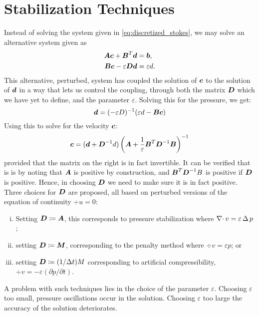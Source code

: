 \section{Stabilization Techniques}

Instead of solving the system given in \cref{eq:discretized_stokes}, we may
solve an alternative system given as
\begin{align}
    \boldsymbol{A}\boldsymbol{c} + \boldsymbol{B}^T \boldsymbol{d} &= \boldsymbol{b}, \\
    \boldsymbol{B}\boldsymbol{c} - \varepsilon \boldsymbol{D} \boldsymbol{d} &= \varepsilon d.
\end{align}
This alternative, perturbed,  system has coupled the solution of \( \boldsymbol{c} \) to
the solution of \( \boldsymbol{d} \) in a way that lets us control the coupling, through
both the matrix \( \boldsymbol{D} \) which we have yet to define, and the parameter \(
\varepsilon \).  Solving this for the pressure, we get:
\begin{equation}
    \boldsymbol{d} = (-\varepsilon D)^{-1}(\varepsilon d- \boldsymbol{B} \boldsymbol{c})
\end{equation}
Using this to solve for the velocity \( \boldsymbol{c} \):
\begin{equation}
    \boldsymbol{c} = (\boldsymbol{d} + \boldsymbol{D}^{-1}d) \left(\boldsymbol{A} + \frac{1}{\varepsilon}\boldsymbol{B}^T\boldsymbol{D}^{-1}\boldsymbol{B}\right)^{-1}
\end{equation}
provided that the matrix on the right is in fact invertible. It can be verified
that is is by noting that \(\boldsymbol{A}\) is positive by construction, and \( \boldsymbol{B}^T
\boldsymbol{D}^{-1} B \) is positive if \( \boldsymbol{D} \) is positive. Hence, in choosing \( \boldsymbol{D} \) we
need to make sure it is in fact positive. Three choices for \( \boldsymbol{D} \) are
proposed, all based on perturbed versions of the equation of continuity \( \div
u = 0 \):
\begin{enumerate}[(i)]
    \item Setting \( \boldsymbol{D} \coloneqq \boldsymbol{A} \), this corresponds to pressure
        stabilization where \(\operatorname{\mathop{}\!\nabla \cdot} v = \varepsilon \operatorname{\mathop{}\!\Delta} p \); 
    \item setting \( \boldsymbol{D} \coloneqq \boldsymbol{M}\), corresponding to the
        penalty method where \( \div v = \varepsilon p \); or 
    \item setting \( \boldsymbol{D} \coloneqq (1/\Delta t) M\) corresponding to artificial
        compressibility, \( \div v= -\varepsilon (\partial p/\partial t)
        \).
\end{enumerate}
A problem with such techniques lies in the choice of the parameter \(
\varepsilon \). Choosing \( \varepsilon \) too small, pressure oscillations
occur in the solution. Choosing \( \varepsilon \) too large the accuracy of the
solution deteriorates.
